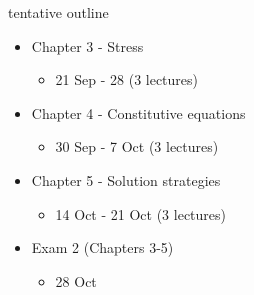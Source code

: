 \documentclass[
  letterpaper,
  ignorenonframetext,
  aspectratio=43,
  handout,
  12pt]{beamer}
\providecommand{\tightlist}{%
  \setlength{\itemsep}{0pt}\setlength{\parskip}{0pt}}
\providecommand{\tightlist}{%
\setlength{\itemsep}{0pt}\setlength{\parskip}{0pt}}
\begin{document}
\begin{frame}{tentative outline}
\protect\hypertarget{tentative-outline-1}{}
\begin{itemize}
\tightlist
\item
  Chapter 3 - Stress

  \begin{itemize}
  \tightlist
  \item
    21 Sep - 28 (3 lectures)
  \end{itemize}
\item
  Chapter 4 - Constitutive equations

  \begin{itemize}
  \tightlist
  \item
    30 Sep - 7 Oct (3 lectures)
  \end{itemize}
\item
  Chapter 5 - Solution strategies

  \begin{itemize}
  \tightlist
  \item
    14 Oct - 21 Oct (3 lectures)
  \end{itemize}
\item
  Exam 2 (Chapters 3-5)

  \begin{itemize}
  \tightlist
  \item
    28 Oct
  \end{itemize}
\end{itemize}
\end{frame}
\end{document}
